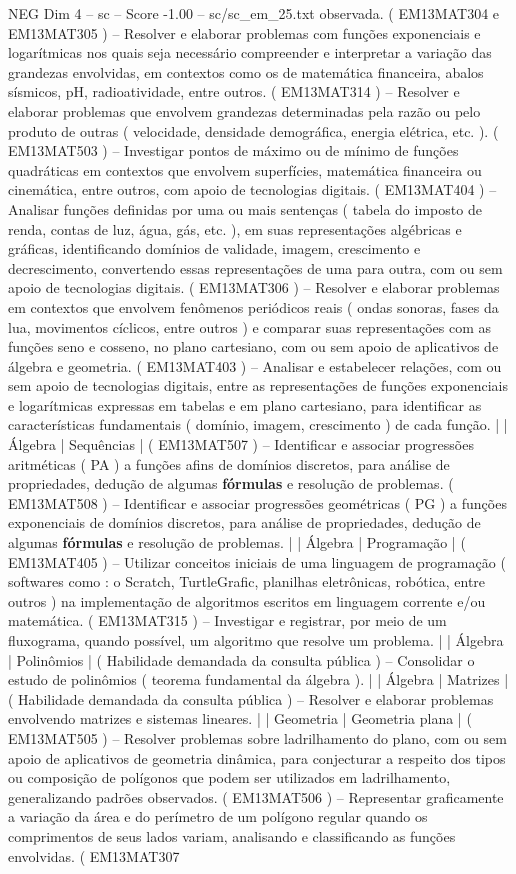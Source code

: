 \begin{textsample}{NEG Dim 4 – sc – Score -1.00 – sc/sc\_em\_25.txt}
observada. ( EM13MAT304 e EM13MAT305 ) – Resolver e elaborar problemas com funções exponenciais e logarítmicas nos quais seja necessário compreender e interpretar a variação das grandezas envolvidas, em contextos como os de matemática financeira, abalos sísmicos, pH, radioatividade, entre outros. ( EM13MAT314 ) – Resolver e elaborar problemas que envolvem grandezas determinadas pela razão ou pelo produto de outras ( velocidade, densidade demográfica, energia elétrica, etc. ). ( EM13MAT503 ) – Investigar pontos de máximo ou de mínimo de funções quadráticas em contextos que envolvem superfícies, matemática financeira ou cinemática, entre outros, com apoio de tecnologias digitais. ( EM13MAT404 ) – Analisar funções definidas por uma ou mais sentenças ( tabela do imposto de renda, contas de luz, água, gás, etc. ), em suas representações algébricas e gráficas, identificando domínios de validade, imagem, crescimento e decrescimento, convertendo essas representações de uma para outra, com ou sem apoio de tecnologias digitais. ( EM13MAT306 ) – Resolver e elaborar problemas em contextos que envolvem fenômenos periódicos reais ( ondas sonoras, fases da lua, movimentos cíclicos, entre outros ) e comparar suas representações com as funções seno e cosseno, no plano cartesiano, com ou sem apoio de aplicativos de álgebra e geometria. ( EM13MAT403 ) – Analisar e estabelecer relações, com ou sem apoio de tecnologias digitais, entre as representações de funções exponenciais e logarítmicas expressas em tabelas e em plano cartesiano, para identificar as características fundamentais ( domínio, imagem, crescimento ) de cada função. | | Álgebra | Sequências | ( EM13MAT507 ) – Identificar e associar progressões aritméticas ( PA ) a funções afins de domínios discretos, para análise de propriedades, dedução de algumas \textbf{fórmulas} e resolução de problemas. ( EM13MAT508 ) – Identificar e associar progressões geométricas ( PG ) a funções exponenciais de domínios discretos, para análise de propriedades, dedução de algumas \textbf{fórmulas} e resolução de problemas. | | Álgebra | Programação | ( EM13MAT405 ) – Utilizar conceitos iniciais de uma linguagem de programação ( softwares como : o Scratch, TurtleGrafic, planilhas eletrônicas, robótica, entre outros ) na implementação de algoritmos escritos em linguagem corrente e/ou matemática. ( EM13MAT315 ) – Investigar e registrar, por meio de um fluxograma, quando possível, um algoritmo que resolve um problema. | | Álgebra | Polinômios | ( Habilidade demandada da consulta pública ) – Consolidar o estudo de polinômios ( teorema fundamental da álgebra ). | | Álgebra | Matrizes | ( Habilidade demandada da consulta pública ) – Resolver e elaborar problemas envolvendo matrizes e sistemas lineares. | | Geometria | Geometria plana | ( EM13MAT505 ) – Resolver problemas sobre ladrilhamento do plano, com ou sem apoio de aplicativos de geometria dinâmica, para conjecturar a respeito dos tipos ou composição de polígonos que podem ser utilizados em ladrilhamento, generalizando padrões observados. ( EM13MAT506 ) – Representar graficamente a variação da área e do perímetro de um polígono regular quando os comprimentos de seus lados variam, analisando e classificando as funções envolvidas. ( EM13MAT307 
\end{textsample}
